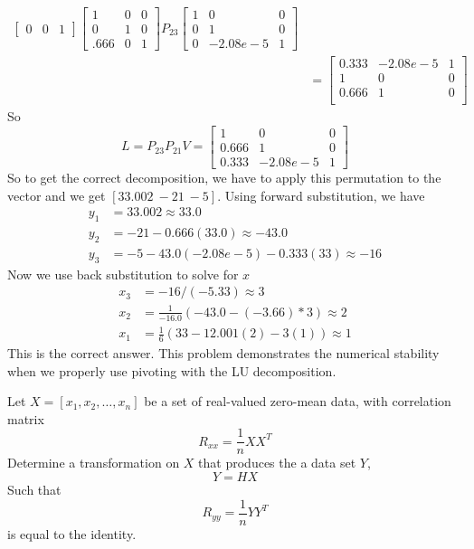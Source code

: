 \documentclass{homework}
\begin{document}
\begin{solution}
\[\begin{aligned}
\begin{bmatrix}
      0 & 0 & 1
    \end{bmatrix}
    \begin{bmatrix}
      1 & 0 & 0 \\
      0 & 1 & 0 \\
      .666 & 0 & 1
    \end{bmatrix}
    P_{23}
    \begin{bmatrix}
      1 & 0 & 0 \\
      0 & 1 & 0 \\
      0 & -2.08e-5 & 1
    \end{bmatrix} \\
    &=
    \begin{bmatrix}
      0.333 & -2.08e-5 & 1 \\
      1 & 0 & 0 \\
      0.666 & 1 & 0 \\
    \end{bmatrix}
  \end{aligned}
  \]
  So
  \[
    L = 
    P_{23}P_{21}V = 
    \begin{bmatrix}
      1 & 0 & 0 \\
      0.666 & 1 & 0 \\
      0.333 & -2.08e-5 & 1 
    \end{bmatrix}
  \]
  So to get the correct decomposition, we have to apply this permutation to the vector and we get $[33.002\ -21\ -5]$.
  Using forward substitution, we have
  \[
    \begin{aligned}
      y_1 &= 33.002 \approx 33.0 \\
      y_2 &= -21 - 0.666(33.0) \approx -43.0 \\
      y_3 &= -5 -43.0(-2.08e-5) -0.333(33) \approx -16
    \end{aligned}
  \]
  Now we use back substitution to solve for $x$
  \[
    \begin{aligned}
      x_3 &= -16/(-5.33) \approx 3 \\
      x_2 &= \frac{1}{-16.0}(-43.0 - (-3.66)*3) \approx 2 \\
      x_1 &= \frac{1}{6}(33 - 12.001(2) - 3(1)) \approx 1
    \end{aligned}
  \]
  This is the correct answer. This problem demonstrates the numerical stability when we properly use pivoting with the LU decomposition.
\end{solution}

\begin{problem}[5-8]
  Let $X = [x_1,x_2,\dots,x_n]$ be a set of real-valued zero-mean data, with correlation matrix
  \[R_{xx} = \frac{1}{n} XX^T\]
  Determine a transformation on $X$ that produces the a data set $Y$,
  \[ Y = HX\]
  Such that 
  \[R_{yy} = \frac{1}{n}YY^T\]
  is equal to the identity.
\end{problem}
\end{document}
